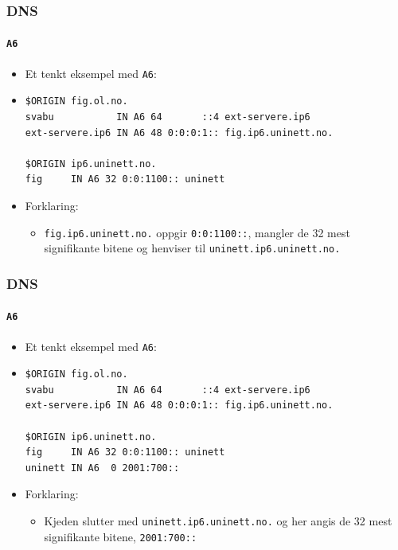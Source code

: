 \begin{frame}[fragile]%
  \frametitle{DNS}
  \framesubtitle{\texttt{A6}}
  \begin{itemize}%
  \item Et tenkt eksempel med \texttt{A6}:
  \item 
\begin{verbatim}
$ORIGIN fig.ol.no.
svabu           IN A6 64       ::4 ext-servere.ip6
ext-servere.ip6 IN A6 48 0:0:0:1:: fig.ip6.uninett.no.

$ORIGIN ip6.uninett.no.
fig     IN A6 32 0:0:1100:: uninett
\end{verbatim}
  \item Forklaring:
    \begin{itemize}%
    \item \texttt{fig.ip6.uninett.no.} oppgir \texttt{0:0:1100::},
      mangler de 32 mest signifikante bitene og henviser til
      \texttt{uninett.ip6.uninett.no.}
    \end{itemize}
  \end{itemize}
\end{frame}

\begin{frame}[fragile]%
  \frametitle{DNS}
  \framesubtitle{\texttt{A6}}
  \begin{itemize}%
  \item Et tenkt eksempel med \texttt{A6}:
  \item 
\begin{verbatim}
$ORIGIN fig.ol.no.
svabu           IN A6 64       ::4 ext-servere.ip6
ext-servere.ip6 IN A6 48 0:0:0:1:: fig.ip6.uninett.no.

$ORIGIN ip6.uninett.no.
fig     IN A6 32 0:0:1100:: uninett
uninett IN A6  0 2001:700::
\end{verbatim}
  \item Forklaring:
    \begin{itemize}%
    \item Kjeden slutter med \texttt{uninett.ip6.uninett.no.} og her
      angis de 32 mest signifikante bitene, \texttt{2001:700::}
    \end{itemize}
  \end{itemize}
\end{frame}

